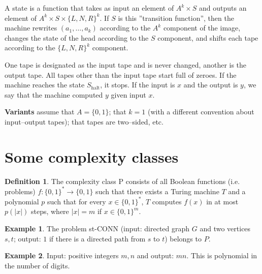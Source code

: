 \documentclass{article}
\theoremstyle{definition}
\newtheorem{example}{Example}[section]
\newtheorem{defn}{Definition}[section]
\begin{document}
A state is a function that takes as input an element of $A^k \times S$ and outputs an element of $A^k \times S \times \{L, N, R\}^k$. If $S$ is this ''transition function'', then the machine rewrites $(a_1,\ldots,a_k)$ according to the $A^k$ component of the image, changes the state of the head according to the $S$ component, and shifts each tape according to the $\{L,N,R\}^k$ component.
\vspace{1mm}
 
One tape is designated as the input tape and is never changed, another is the output tape. All tapes other than the input tape start full of zeroes. If the machine reaches the state $S_{\text{halt}}$, it stops. If the input is $x$ and the output is $y$, we say that the machine computed $y$ given input $x$.
\vspace{1mm}
 
\textbf{Variants} assume that $A = \{0,1\}$; that $k=1$ (with a different convention about input--output tapes); that tapes are two--sided, etc.

\section{Some complexity classes}

\begin{defn}
    The complexity class P consists of all Boolean functions (i.e. problems) $f: \{0,1\}^* \to \{0,1\}$ such that there exists a Turing machine $T$ and a polynomial $p$ such that for every $x \in \{0,1\}^*$, $T$ computes $f(x)$ in at most $p(|x|)$ steps, where $|x| = m$ if $x \in \{0,1\}^m$.
\end{defn}

\begin{example}
    The problem st-CONN (input: directed graph $G$ and two vertices $s,t$; output: $1$ if there is a directed path from $s$ to $t$) belongs to $P$.
\end{example}
\begin{example}
    Input: positive integers $m,n$ and output: $mn$. This is polynomial in the number of digits.
\end{example}
\end{document}
